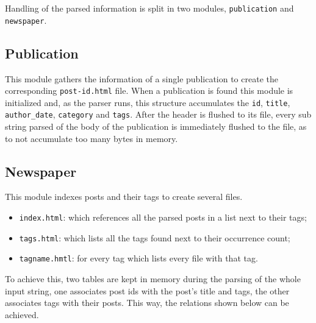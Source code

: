 \documentclass[a4paper]{report}
\begin{document}
Handling of the parsed information is split in two modules,
\texttt{publication} and \texttt{newspaper}.

\subsection{Publication}

This module gathers the information of a single publication to create the
corresponding \texttt{post-id.html} file. When a publication is found this
module is initialized and, as the parser runs, this structure accumulates the
\texttt{id}, \texttt{title}, \texttt{author\_date}, \texttt{category} and
\texttt{tags}. After the header is flushed to its file, every sub
string parsed of the body of the publication is immediately flushed to the file,
as to not accumulate too many bytes in memory.

\subsection{Newspaper}

This module indexes posts and their tags to create several files.
\begin{itemize}
    \item \texttt{index.html}: which references all the parsed posts in
        a list next to their tags;
    \item \texttt{tags.html}: which lists all the tags found next to
        their occurrence count;
    \item \texttt{tagname.hmtl}: for every tag which lists every file with
        that tag.
\end{itemize}

To achieve this, two tables are kept in memory during the parsing of the whole
input string, one associates post ids with the post's title and tags, the other
associates tags with their posts. This way, the relations shown below can be
achieved.
\end{document}

